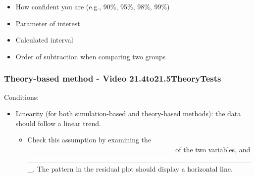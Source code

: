 \documentclass[
]{report}
\providecommand{\tightlist}{%
  \setlength{\itemsep}{0pt}\setlength{\parskip}{0pt}}
\begin{document}
\begin{itemize}
\item
  How confident you are (e.g., 90\%, 95\%, 98\%, 99\%)
\item
  Parameter of interest
\item
  Calculated interval
\item
  Order of subtraction when comparing two groups
\end{itemize}

\vspace{0.8in}

\subsubsection*{Theory-based method - Video 21.4to21.5TheoryTests}\label{theory-based-method---video-21.4to21.5theorytests}

Conditions:


\begin{itemize}
\item
  Linearity (for both simulation-based and theory-based methods): the data should follow a linear trend.

  \begin{itemize}
  \tightlist
  \item
    Check this assumption by examining the \_\_\_\_\_\_\_\_\_\_\_\_\_\_\_\_\_\_\_\_\_\_\_\_\_\_\_\_ of the two variables, and \_\_\_\_\_\_\_\_\_\_\_\_\_\_\_\_\_\_\_\_\_\_\_\_\_\_\_\_\_\_\_\_\_\_\_\_\_\_\_\_\_\_\_\_. The pattern in the residual plot should display a horizontal line.
  \end{itemize}
\end{itemize}

\newpage
\end{document}
